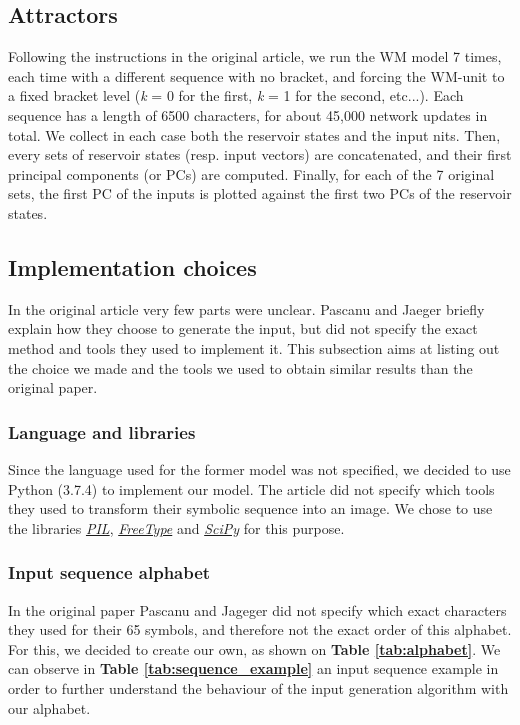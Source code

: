 \subsection{Attractors}

Following the instructions in the original article, we run the WM model 7 times, each time with a different sequence with no bracket, and forcing the WM-unit to a fixed bracket level (\textit{k} = 0 for the first, \textit{k} = 1 for the second, etc...). Each sequence has a length of 6500 characters, for about 45,000 network updates in total. We collect in each case both the reservoir states and the input nits. Then, every sets of reservoir states (resp. input vectors) are concatenated, and their first principal components (or PCs) are computed. Finally, for each of the 7 original sets, the first PC of the inputs is plotted against the first two PCs of the reservoir states.

\subsection{Implementation choices}

In the original article very few parts were unclear. Pascanu and Jaeger briefly explain how they choose to generate the input, but did not specify the exact method and tools they used to implement it. This subsection aims at listing out the choice we made and the tools we used to obtain similar results than the original paper.

\subsubsection{Language and libraries}

Since the language used for the former model was not specified, we decided to use Python (3.7.4) to implement our model.
The article did not specify which tools they used to transform their symbolic sequence into an image.
We chose to use the libraries \href{https://pillow.readthedocs.io/en/stable/}{\textit{PIL}}, \href{https://github.com/rougier/freetype-py}{\textit{FreeType}} and \href{https://www.scipy.org/}{\textit{SciPy}} for this purpose.

\subsubsection{Input sequence alphabet}
\label{s:input_gen2}

In the original paper Pascanu and Jageger did not specify which exact characters they used for their 65 symbols, and therefore not the exact order of this alphabet. For this, we decided to create our own, as shown on \textbf{Table \ref{tab:alphabet}}. We can observe in \textbf{Table \ref{tab:sequence_example}} an input sequence example in order to further understand the behaviour of the input generation algorithm with our alphabet.

